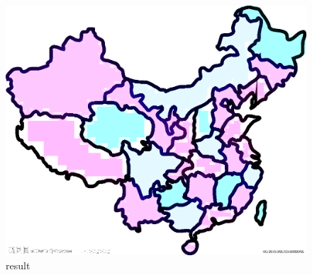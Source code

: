 \documentclass{article}
\begin{document}
\begin{figure}[H]
{\begin{minipage}[t]{0.3\linewidth}
\centering
\includegraphics[width=\linewidth]{result_35.png}
\caption{result}
\end{minipage}
}%
\centering
\end{figure}
\end{document}
